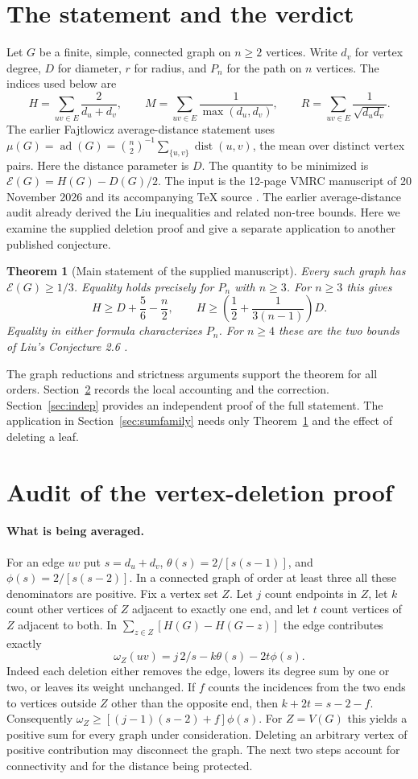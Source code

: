 \documentclass[11pt,a4paper]{article}
\newtheorem{theorem}{Theorem}[section]
\newcommand{\gap}{\mathcal{E}}
\newcommand{\dd}{\operatorname{dist}}
\begin{document}
\section{The statement and the verdict}
Let $G$ be a finite, simple, connected graph on $n\ge2$ vertices. Write $d_v$ for vertex degree, $D$ for diameter, $r$ for radius, and $P_n$ for the path on $n$ vertices. The indices used below are
\[
 H=\sum_{uv\in E}\frac2{d_u+d_v},\qquad M=\sum_{uv\in E}\frac1{\max(d_u,d_v)},\qquad
 R=\sum_{uv\in E}\frac1{\sqrt{d_ud_v}}.
\]
The earlier Fajtlowicz average-distance statement uses $\mu(G)=\operatorname{ad}(G)=\binom n2^{-1}\sum_{\{u,v\}}\dd(u,v)$, the mean over distinct vertex pairs. Here the distance parameter is $D$. The quantity to be minimized is $\gap(G)=H(G)-D(G)/2$. The input is the 12-page VMRC manuscript of 20 November 2026 and its accompanying TeX source \cite{input}. The earlier average-distance audit \cite{previous} already derived the Liu inequalities and related non-tree bounds. Here we examine the supplied deletion proof and give a separate application to another published conjecture.
\begin{theorem}[Main statement of the supplied manuscript]\label{thm:liu}
Every such graph has $\gap(G)\ge1/3$. Equality holds precisely for $P_n$ with $n\ge3$. For $n\ge3$ this gives
\[
 H\ge D+\frac56-\frac n2,\qquad H\ge\left(\frac12+\frac1{3(n-1)}\right)D.
\]
Equality in either formula characterizes $P_n$. For $n\ge4$ these are the two bounds of Liu's Conjecture 2.6 \cite{liu}.
\end{theorem}
The graph reductions and strictness arguments support the theorem for all orders. Section~\ref{sec:audit} records the local accounting and the correction. Section~\ref{sec:indep} provides an independent proof of the full statement. The application in Section~\ref{sec:sumfamily} needs only Theorem~\ref{thm:liu} and the effect of deleting a leaf.
\section{Audit of the vertex-deletion proof}\label{sec:audit}
\paragraph{What is being averaged.}
For an edge $uv$ put $s=d_u+d_v$, $\theta(s)=2/[s(s-1)]$, and $\phi(s)=2/[s(s-2)]$. In a connected graph of order at least three all these denominators are positive. Fix a vertex set $Z$. Let $j$ count endpoints in $Z$, let $k$ count other vertices of $Z$ adjacent to exactly one end, and let $t$ count vertices of $Z$ adjacent to both. In $\sum_{z\in Z}[H(G)-H(G-z)]$ the edge contributes exactly
\[
 \omega_Z(uv)=j\,2/s-k\theta(s)-2t\phi(s).
\]
Indeed each deletion either removes the edge, lowers its degree sum by one or two, or leaves its weight unchanged. If $f$ counts the incidences from the two ends to vertices outside $Z$ other than the opposite end, then $k+2t=s-2-f$. Consequently $\omega_Z\ge[(j-1)(s-2)+f]\phi(s)$. For $Z=V(G)$ this yields a positive sum for every graph under consideration. Deleting an arbitrary vertex of positive contribution may disconnect the graph. The next two steps account for connectivity and for the distance being protected.
\end{document}
